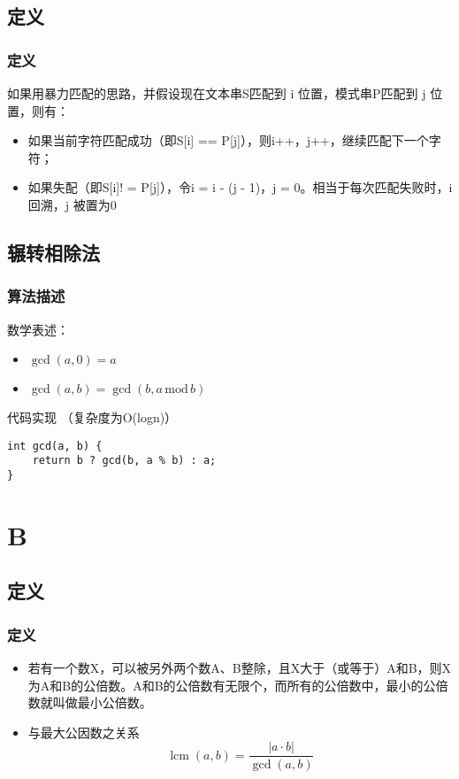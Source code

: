 \documentclass{beamer}
\begin{document}
\subsection{定义}
\begin{frame}
\frametitle{定义}
 如果用暴力匹配的思路，并假设现在文本串S匹配到 i 位置，模式串P匹配到 j 位置，则有：
\begin{itemize}
\item 如果当前字符匹配成功（即S[i] == P[j]），则i++，j++，继续匹配下一个字符；
\item 如果失配（即S[i]! = P[j]），令i = i - (j - 1)，j = 0。相当于每次匹配失败时，i 回溯，j 被置为0

\end{itemize}
\begin{block}
	
\end{block}
\end{frame}

\subsection{辗转相除法}
\begin{frame}[fragile]
\frametitle{算法描述}
数学表述：
\begin{itemize}
\item ${\displaystyle \gcd(a,0)=a}$
\item ${\displaystyle \gcd(a,b)=\gcd(b,a\,\mathrm {mod} \,b)} $
\end{itemize}
\begin{block}{代码实现  （复杂度为O(logn)）}
\begin{lstlisting}
int gcd(a, b) {
    return b ? gcd(b, a % b) : a;
}
\end{lstlisting}
\end{block}
\end{frame}

\section{B}
\subsection{定义}
\begin{frame}
\frametitle{定义}
\begin{itemize}
\item 若有一个数X，可以被另外两个数A、B整除，且X大于（或等于）A和B，则X为A和B的公倍数。A和B的公倍数有无限个，而所有的公倍数中，最小的公倍数就叫做最小公倍数。
\item 与最大公因数之关系 $$ \operatorname {lcm}(a,b)={\frac  {|a\cdot b|}{\operatorname {gcd}(a,b)}} $$
\end{itemize}
\end{frame}
\end{document}
